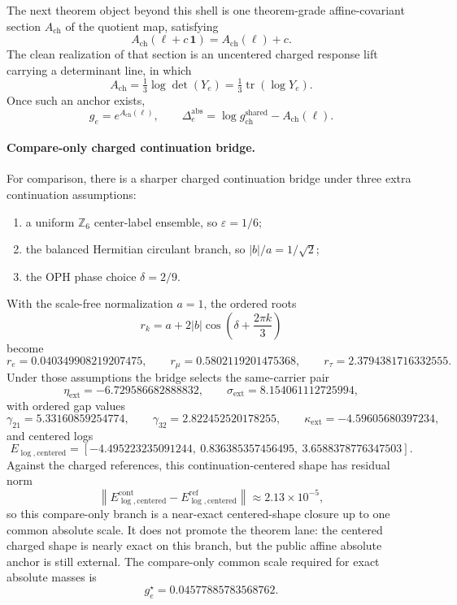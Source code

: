 \documentclass[11pt]{article}
\begin{document}
The next theorem object beyond this shell is one
theorem-grade affine-covariant section \(A_{\mathrm{ch}}\) of the quotient map, satisfying
\[
A_{\mathrm{ch}}(\ell + c\,\mathbf 1)=A_{\mathrm{ch}}(\ell)+c.
\]
The clean realization of that section is an uncentered charged response lift carrying a
determinant line, in which
\[
A_{\mathrm{ch}}=\tfrac13 \log \det(Y_e)=\tfrac13 \operatorname{tr}(\log Y_e).
\]
Once such an anchor exists,
\[
g_e = e^{A_{\mathrm{ch}}(\ell)},
\qquad
\Delta_e^{\mathrm{abs}} = \log g_{\mathrm{ch}}^{\mathrm{shared}} - A_{\mathrm{ch}}(\ell).
\]

\paragraph{Compare-only charged continuation bridge.}
For comparison, there is a sharper charged continuation bridge under three extra continuation
assumptions:
\begin{enumerate}[leftmargin=2em]
\item a uniform \(\mathbb Z_6\) center-label ensemble, so \(\varepsilon = 1/6\);
\item the balanced Hermitian circulant branch, so \(|b|/a = 1/\sqrt2\);
\item the OPH phase choice \(\delta = 2/9\).
\end{enumerate}
With the scale-free normalization \(a=1\), the ordered roots
\[
r_k = a + 2|b|\cos\!\left(\delta + \frac{2\pi k}{3}\right)
\]
become
\[
r_e = 0.040349908219207475,
\qquad
r_\mu = 0.5802119201475368,
\qquad
r_\tau = 2.3794381716332555.
\]
Under those assumptions the bridge selects the same-carrier pair
\[
\eta_{\mathrm{ext}} = -6.729586682888832,
\qquad
\sigma_{\mathrm{ext}} = 8.154061112725994,
\]
with ordered gap values
\[
\gamma_{21}=5.33160859254774,
\qquad
\gamma_{32}=2.822452520178255,
\qquad
\kappa_{\mathrm{ext}}=-4.59605680397234,
\]
and centered logs
\[
E_{\log,\mathrm{centered}}
=
[-4.495223235091244,\ 0.836385357456495,\ 3.6588378776347503].
\]
Against the charged references, this continuation-centered shape has residual norm
\[
\left\|E_{\log,\mathrm{centered}}^{\mathrm{cont}}
-E_{\log,\mathrm{centered}}^{\mathrm{ref}}\right\|
\approx
2.13\times10^{-5},
\]
so this compare-only branch is a near-exact centered-shape closure up to one common absolute
scale. It does not promote the theorem lane: the centered charged shape is nearly exact on this
branch, but the public affine absolute anchor is still external. The compare-only common scale
required for exact absolute masses is
\[
g_e^\star = 0.04577885783568762.
\]
\end{document}
